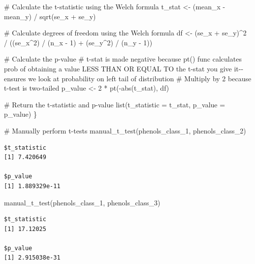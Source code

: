 \documentclass[
  letterpaper,
  DIV=11,
  numbers=noendperiod]{scrartcl}
\newenvironment{Shaded}{\begin{snugshade}}{\end{snugshade}}
\newcommand{\AttributeTok}[1]{\textcolor[rgb]{0.40,0.45,0.13}{#1}}
\newcommand{\CommentTok}[1]{\textcolor[rgb]{0.37,0.37,0.37}{#1}}
\newcommand{\DecValTok}[1]{\textcolor[rgb]{0.68,0.00,0.00}{#1}}
\newcommand{\FunctionTok}[1]{\textcolor[rgb]{0.28,0.35,0.67}{#1}}
\newcommand{\NormalTok}[1]{\textcolor[rgb]{0.00,0.23,0.31}{#1}}
\newcommand{\OtherTok}[1]{\textcolor[rgb]{0.00,0.23,0.31}{#1}}
\newcommand{\SpecialCharTok}[1]{\textcolor[rgb]{0.37,0.37,0.37}{#1}}
\begin{document}
\begin{Shaded}
\begin{Highlighting}[]
  \CommentTok{\# Calculate the t{-}statistic using the Welch formula}
\NormalTok{  t\_stat }\OtherTok{\textless{}{-}}\NormalTok{ (mean\_x }\SpecialCharTok{{-}}\NormalTok{ mean\_y) }\SpecialCharTok{/} \FunctionTok{sqrt}\NormalTok{(se\_x }\SpecialCharTok{+}\NormalTok{ se\_y)}
  
  \CommentTok{\# Calculate degrees of freedom using the Welch formula}
\NormalTok{  df }\OtherTok{\textless{}{-}}\NormalTok{ (se\_x }\SpecialCharTok{+}\NormalTok{ se\_y)}\SpecialCharTok{\^{}}\DecValTok{2} \SpecialCharTok{/}\NormalTok{ ((se\_x}\SpecialCharTok{\^{}}\DecValTok{2}\NormalTok{) }\SpecialCharTok{/}\NormalTok{ (n\_x }\SpecialCharTok{{-}} \DecValTok{1}\NormalTok{) }\SpecialCharTok{+}\NormalTok{ (se\_y}\SpecialCharTok{\^{}}\DecValTok{2}\NormalTok{) }\SpecialCharTok{/}\NormalTok{ (n\_y }\SpecialCharTok{{-}} \DecValTok{1}\NormalTok{))}
  
  \CommentTok{\# Calculate the p{-}value}
  \CommentTok{\# t{-}stat is made negative because pt() func calculates prob of obtaining a value LESS THAN OR EQUAL TO the t{-}stat you give it{-}{-} ensures we look at probability on left tail of distribution}
  \CommentTok{\# Multiply by 2 because t{-}test is two{-}tailed}
\NormalTok{  p\_value }\OtherTok{\textless{}{-}} \DecValTok{2} \SpecialCharTok{*} \FunctionTok{pt}\NormalTok{(}\SpecialCharTok{{-}}\FunctionTok{abs}\NormalTok{(t\_stat), df)}
  
  \CommentTok{\# Return the t{-}statistic and p{-}value}
  \FunctionTok{list}\NormalTok{(}\AttributeTok{t\_statistic =}\NormalTok{ t\_stat, }\AttributeTok{p\_value =}\NormalTok{ p\_value)}
\NormalTok{\}}

\CommentTok{\# Manually perform t{-}tests}
\FunctionTok{manual\_t\_test}\NormalTok{(phenols\_class\_1, phenols\_class\_2)}
\end{Highlighting}
\end{Shaded}

\begin{verbatim}
$t_statistic
[1] 7.420649

$p_value
[1] 1.889329e-11
\end{verbatim}

\begin{Shaded}
\begin{Highlighting}[]
\FunctionTok{manual\_t\_test}\NormalTok{(phenols\_class\_1, phenols\_class\_3)}
\end{Highlighting}
\end{Shaded}

\begin{verbatim}
$t_statistic
[1] 17.12025

$p_value
[1] 2.915038e-31
\end{verbatim}
\end{document}
